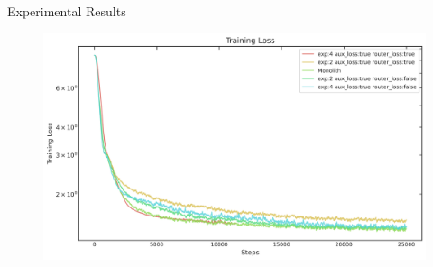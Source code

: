 \documentclass[final]{beamer}
\newlength{\colwidth}
\begin{document}
\begin{frame}[t]
\begin{columns}[t]
\begin{column}{\colwidth}


    
    







  \begin{block}{Experimental Results}
    
    \begin{figure}
      \centering
      \includegraphics[width=1\linewidth]{figures/loss_curve.png}
      \label{fig:loss_curve}
   \end{figure}


\end{block}
\end{column}
\end{columns}
\end{frame}
\end{document}

